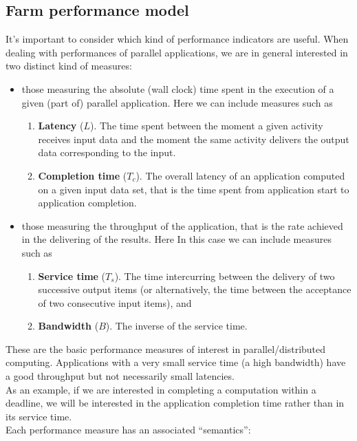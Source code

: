 \subsection{Farm performance model}
\label{subs:farmperfmodel}
	It's important to consider which kind of performance indicators are useful. When dealing with performances of parallel applications, we are in general interested in two distinct kind of measures:
	\begin{itemize}
		\item those measuring the absolute (wall clock) time spent in the execution of a given (part of) parallel application. Here we can include measures such as
		\begin{enumerate}
			\item \textbf{Latency} (\(L\)). The time spent between the moment a given activity receives input data and	the moment the same activity delivers the output data corresponding to the input.
			\item \textbf{Completion time} (\(T_c\)). The overall latency of an application computed on a given input data set, that is the time spent from application start to application completion.
		\end{enumerate}
		\item those measuring the throughput of the application, that is the rate achieved in the delivering of the results. Here In this case we can include measures such as
		\begin{enumerate}
			\item \textbf{Service time} (\(T_s\)). The time intercurring between the delivery of two successive output items (or alternatively, the time between the acceptance of two consecutive input items), and
			\item \textbf{Bandwidth} (\(B\)). The inverse of the service time.
		\end{enumerate}
	\end{itemize}
	These are the basic performance measures of interest in parallel/distributed computing.
	Applications with a very small service time (a high bandwidth) have a good throughput but not necessarily small latencies\cite{spm}.\\
	As an example, if we are interested in completing a computation within a deadline, we will be interested in the application completion time rather than in its service time.\\
	Each performance measure has an associated “semantics”:
